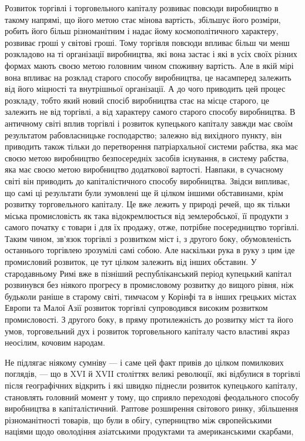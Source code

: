 Розвиток торгівлі і торговельного капіталу розвиває повсюди
виробництво в такому напрямі, що його метою стає мінова вартість,
збільшує його розміри, робить його більш різноманітним і
надає йому космополітичного характеру, розвиває гроші у світові
гроші. Тому торгівля повсюди впливає більш чи менш розкладово
на ті організації виробництва, які вона застає і які в усіх
своїх різних формах мають своєю метою головним чином споживну
вартість. Але в якій мірі вона впливає на розклад старого
способу виробництва, це насамперед залежить від його
міцності та внутрішньої організації. А до чого приводить цей
процес розкладу, тобто який новий спосіб виробництва стає на
місце старого, це залежить не від торгівлі, а від характеру
самого старого способу виробництва. В античному світі вплив
торгівлі і розвиток купецького капіталу завжди має своїм результатом
рабовласницьке господарство; залежно від вихідного
пункту, він приводить також тільки до перетворення патріархальної
системи рабства, яка має своєю метою виробництво безпосередніх
засобів існування, в систему рабства, яка має своєю
метою виробництво додаткової вартості. Навпаки, в сучасному
світі він приводить до капіталістичного способу виробництва.
Звідси випливає, що самі ці результати були зумовлені ще
й цілком іншими обставинами, крім розвитку торговельного капіталу.
Це вже лежить у природі речей, що як тільки міська промисловість
як така відокремлюється від землеробської, її продукти
з самого початку є товари і для їх продажу, отже, потрібне
посередництво торгівлі. Таким чином, зв’язок торгівлі
з розвитком міст і, з другого боку, обумовленість останнього
торгівлею зрозумілі самі собою. Але наскільки рука в руку
з цим іде промисловий розвиток, це тут цілком залежить від
інших обставин. У стародавньому Римі вже в пізніший республіканський
період купецький капітал розвинувся без ніякого
прогресу в промисловому розвитку до вищого рівня, ніж будьколи
раніше в старому світі, тимчасом у Корінфі та в інших
грецьких містах Европи та Малої Азії розвиток торгівлі супроводився
високим розвитком промисловості. З другого боку,
в пряму протилежність до розвитку міст та його умов, торговельний
дух і розвиток торговельного капіталу часто властиві
якраз неосілим, кочовим народам.

Не підлягає ніякому сумніву — і саме цей факт привів до
цілком помилкових поглядів, — що в XVI й XVII століттях великі
революції, які відбулися в торгівлі після географічних відкрить
і які швидко піднесли розвиток купецького капіталу,
становлять головний момент у тому, що сприяло переходові
феодального способу виробництва в капіталістичний. Раптове
розширення світового ринку, збільшення різноманітності товарів,
що були в обігу, суперництво між європейськими націями щодо
оволодіння азіатськими продуктами та американськими скарбами,
